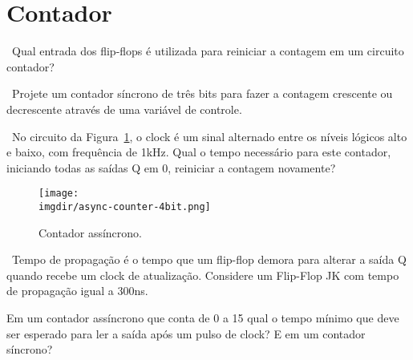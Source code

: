 \section*{Contador}

\exercise~Qual entrada dos flip-flops é utilizada para reiniciar a contagem em
um circuito contador?

\exercise~Projete um contador síncrono de três bits para fazer a
contagem crescente ou decrescente através de uma variável de controle.

\exercise~No circuito da Figura~\ref{fig:counter}, o clock é um sinal
alternado entre os níveis lógicos alto e baixo, com frequência de
1kHz. Qual o tempo necessário para este contador, iniciando todas as
saídas Q em $0$, reiniciar a contagem novamente?

\begin{figure}[ht]
  \centering  
  \texttt{[image: \\imgdir/async-counter-4bit.png]}
  \caption{Contador assíncrono.}
  \label{fig:counter}
\end{figure}

\exercise~Tempo de propagação é o tempo que um flip-flop demora para
alterar a saída Q quando recebe um clock de atualização. Considere um
Flip-Flop JK com tempo de propagação igual a 300ns.  

Em um contador assíncrono que conta de 0 a 15 qual o tempo mínimo que
deve ser esperado para ler a saída após um pulso de clock? E em um
contador síncrono?
